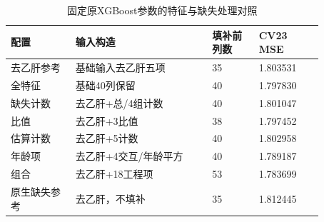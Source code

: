 \begin{table}[htbp]
\small
\setlength{\tabcolsep}{5pt}
\centering
\caption{固定原XGBoost参数的特征与缺失处理对照}
\label{tab:features}
\begin{tabular}{L{0.18\linewidth}L{0.38\linewidth}L{0.13\linewidth}L{0.18\linewidth}}
\toprule
配置 & 输入构造 & 填补前列数 & CV23 MSE \\
\midrule
去乙肝参考 & 基础输入去乙肝五项 & 35 & 1.803531 \\
全特征 & 基础40列保留 & 40 & 1.797830 \\
缺失计数 & 去乙肝+总/4组计数 & 40 & 1.801047 \\
比值 & 去乙肝+3比值 & 38 & 1.797452 \\
估算计数 & 去乙肝+5计数 & 40 & 1.802958 \\
年龄项 & 去乙肝+4交互/年龄平方 & 40 & 1.789187 \\
组合 & 去乙肝+18工程项 & 53 & 1.783699 \\
原生缺失参考 & 去乙肝，不填补 & 35 & 1.812445 \\
\bottomrule
\end{tabular}
\end{table}
